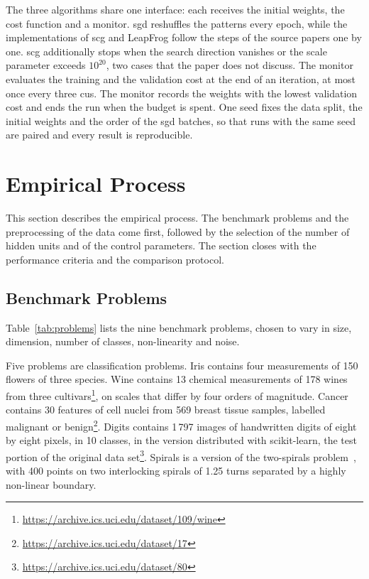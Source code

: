 \documentclass[conference]{IEEEtran}
\begin{document}
The three algorithms share one interface: each receives the initial
weights, the cost function and a monitor. \Gls{sgd} reshuffles the patterns every
epoch, while the implementations of \gls{scg} and LeapFrog follow the steps of the source
papers one by one. \Gls{scg} additionally stops when the search direction vanishes
or the scale parameter exceeds $10^{20}$, two cases that the paper does not
discuss. The monitor evaluates the training and the validation cost at the end of an
iteration, at most once every three \glspl{cu}. The monitor records the weights with the
lowest validation cost and ends the
run when the budget is spent. One seed fixes the data split, the initial weights and the order of the \gls{sgd}
batches, so that runs with the same seed are paired and every result is
reproducible.

\section{Empirical Process}

This section describes the empirical process. The benchmark problems and the
preprocessing of the data come first, followed by the selection of the number of
hidden units and of the control parameters. The section closes with the
performance criteria and the comparison protocol.

\subsection{Benchmark Problems}

Table~\ref{tab:problems} lists the nine benchmark problems, chosen to vary in
size, dimension, number of classes, non-linearity and noise.

\begin{table}[t]
\centering
\caption{Benchmark problems}
\label{tab:problems}
\footnotesize

\end{table}

Five problems are classification problems. Iris contains four measurements of 150
flowers of three species. Wine contains 13 chemical measurements
of 178 wines from three
cultivars\footnote{\url{https://archive.ics.uci.edu/dataset/109/wine}}, on scales
that differ by four orders of magnitude. Cancer contains 30 features of cell nuclei
from 569 breast tissue samples, labelled malignant or
benign\footnote{\url{https://archive.ics.uci.edu/dataset/17}}. Digits contains
1\,797 images of handwritten digits of eight by eight pixels, in 10 classes, in the
version distributed with scikit-learn, the test portion of the original data
set\footnote{\url{https://archive.ics.uci.edu/dataset/80}}. Spirals is a version of the
two-spirals problem~\cite{lang1988}, with 400 points on two interlocking spirals of
1.25 turns separated by a highly non-linear boundary.
\end{document}
